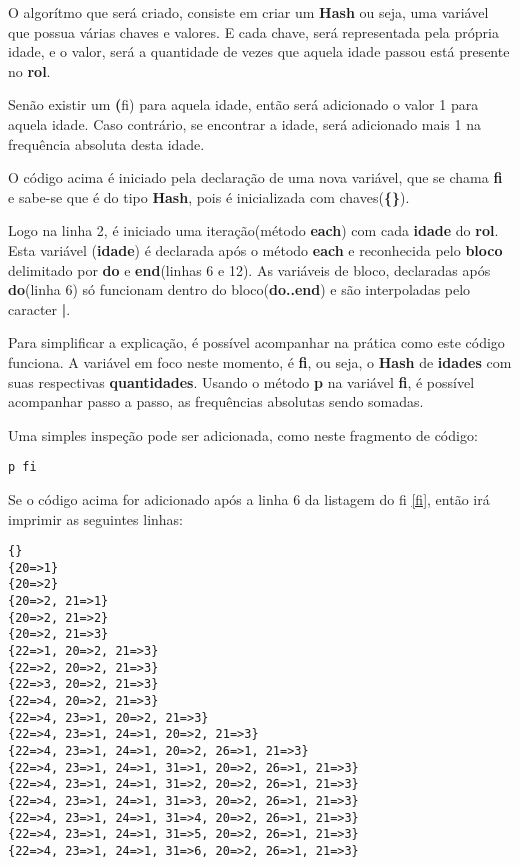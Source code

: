 \documentclass[12pt]{article}
\newcommand{\code}[1] {\textbf{#1}}
\begin{document}
O algorítmo que será criado, consiste em criar um \code{Hash} ou seja, uma variável que possua várias chaves e valores. E cada chave, será representada pela própria idade, e o valor, será a quantidade de vezes que aquela idade passou está presente no \code{rol}. 

Senão existir um \code(fi) para aquela idade, então será adicionado o valor 1 para aquela idade.
Caso contrário, se encontrar a idade, será adicionado mais 1 na frequência absoluta desta idade.

 

O código acima é iniciado pela declaração de uma nova variável, que se chama \code{fi} e sabe-se que é do tipo \code{Hash}, pois é inicializada com chaves(\code{\{\}}). 

Logo na linha 2, é iniciado uma iteração(método \code{each}) com cada \code{idade} do \code{rol}. Esta variável (\code{idade}) é declarada após o método \code{each} e reconhecida pelo \textbf{bloco} delimitado por \code{do} e \code{end}(linhas 6 e 12). As variáveis de bloco, declaradas após \code{do}(linha 6) só funcionam dentro do bloco(\code{do..end}) e são interpoladas pelo caracter \code{|}.

Para simplificar a explicação, é possível acompanhar na prática como este código funciona. A variável em foco neste momento, é \code{fi}, ou seja, o \code{Hash} de \code{idades} com suas respectivas \textbf{quantidades}.
 Usando o método \code{p} na variável \code{fi}, é possível acompanhar passo a passo, as frequências absolutas sendo somadas.

Uma simples inspeção pode ser adicionada, como neste fragmento de código:

\begin{lstlisting}[caption=Inspecionando a soma dos elementos, emph=2]
  p fi
\end{lstlisting}

Se o código acima for adicionado após a linha 6 da listagem do fi \ref{fi}, então irá imprimir as seguintes linhas:

\begin{lstlisting}[caption=inspeção da variável \code{fi} ]
{}
{20=>1}
{20=>2}
{20=>2, 21=>1}
{20=>2, 21=>2}
{20=>2, 21=>3}
{22=>1, 20=>2, 21=>3}
{22=>2, 20=>2, 21=>3}
{22=>3, 20=>2, 21=>3}
{22=>4, 20=>2, 21=>3}
{22=>4, 23=>1, 20=>2, 21=>3}
{22=>4, 23=>1, 24=>1, 20=>2, 21=>3}
{22=>4, 23=>1, 24=>1, 20=>2, 26=>1, 21=>3}
{22=>4, 23=>1, 24=>1, 31=>1, 20=>2, 26=>1, 21=>3}
{22=>4, 23=>1, 24=>1, 31=>2, 20=>2, 26=>1, 21=>3}
{22=>4, 23=>1, 24=>1, 31=>3, 20=>2, 26=>1, 21=>3}
{22=>4, 23=>1, 24=>1, 31=>4, 20=>2, 26=>1, 21=>3}
{22=>4, 23=>1, 24=>1, 31=>5, 20=>2, 26=>1, 21=>3}
{22=>4, 23=>1, 24=>1, 31=>6, 20=>2, 26=>1, 21=>3}
\end{lstlisting}
\end{document}
